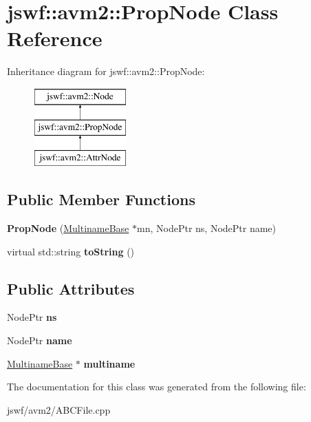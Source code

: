 \hypertarget{classjswf_1_1avm2_1_1_prop_node}{\section{jswf\+:\+:avm2\+:\+:Prop\+Node Class Reference}
\label{classjswf_1_1avm2_1_1_prop_node}
}
Inheritance diagram for jswf\+:\+:avm2\+:\+:Prop\+Node\+:\begin{figure}[H]
\begin{center}
\leavevmode
\includegraphics[height=3.000000cm]{classjswf_1_1avm2_1_1_prop_node}
\end{center}
\end{figure}
\subsection*{Public Member Functions}
\begin{DoxyCompactItemize}
\item 
\hypertarget{classjswf_1_1avm2_1_1_prop_node_acaaf5bc0e22fbb7a991b89ed3a1f0970}{{\bfseries Prop\+Node} (\hyperlink{structjswf_1_1avm2_1_1_multiname_base}{Multiname\+Base} $\ast$mn, Node\+Ptr ns, Node\+Ptr name)}\label{classjswf_1_1avm2_1_1_prop_node_acaaf5bc0e22fbb7a991b89ed3a1f0970}

\item 
\hypertarget{classjswf_1_1avm2_1_1_prop_node_aa785c9185636147f55d0467229eb2090}{virtual std\+::string {\bfseries to\+String} ()}\label{classjswf_1_1avm2_1_1_prop_node_aa785c9185636147f55d0467229eb2090}

\end{DoxyCompactItemize}
\subsection*{Public Attributes}
\begin{DoxyCompactItemize}
\item 
\hypertarget{classjswf_1_1avm2_1_1_prop_node_a09b4b33e3ef75779ab3686dded736824}{Node\+Ptr {\bfseries ns}}\label{classjswf_1_1avm2_1_1_prop_node_a09b4b33e3ef75779ab3686dded736824}

\item 
\hypertarget{classjswf_1_1avm2_1_1_prop_node_a5c8b7670d463863700e69e59ac7e88b9}{Node\+Ptr {\bfseries name}}\label{classjswf_1_1avm2_1_1_prop_node_a5c8b7670d463863700e69e59ac7e88b9}

\item 
\hypertarget{classjswf_1_1avm2_1_1_prop_node_ab18ccdd8da26088af1b96121097c02d1}{\hyperlink{structjswf_1_1avm2_1_1_multiname_base}{Multiname\+Base} $\ast$ {\bfseries multiname}}\label{classjswf_1_1avm2_1_1_prop_node_ab18ccdd8da26088af1b96121097c02d1}

\end{DoxyCompactItemize}


The documentation for this class was generated from the following file\+:\begin{DoxyCompactItemize}
\item 
jswf/avm2/A\+B\+C\+File.\+cpp\end{DoxyCompactItemize}
